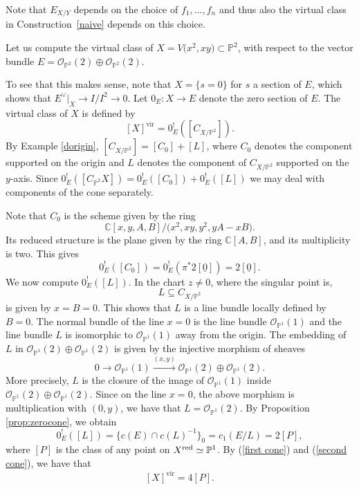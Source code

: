 \documentclass[pdftex]{sigma}
\numberwithin{equation}{section}
\newcommand{\vv}{\mathrm{vir}}
\newcommand{\PP}{\mathbb P}
\begin{document}
Note that $E_{X/Y}$ depends on the choice of $f_1,\ldots, f_n$ and thus also the virtual class in Construction~\ref{naive} depends on this choice.
\begin{Example}\label{doublepoint}
Let us compute the virtual class of $X=V\big(x^2,xy\big)\subset\mathbb{P}^2$, with respect to the vector bundle $E=\mathcal{O}_{\mathbb{P}^2}(2)\oplus \mathcal{O}_{\mathbb{P}^2}(2)$.

To see that this makes sense, note that $X=\{s=0\}$ for $s$ a section of $E$, which shows that $E^\vee\rvert_X\to I/I^2\to 0$. Let $0_E\colon X\to E$ denote the zero section of $E$. The virtual class of $X$ is defined by
\[[X]^{\vv}=0_E^!([C_{X/\mathbb{P}^2}]).
\]
By Example \ref{dorigin}, $[C_{X/\mathbb{P}^2}]=[C_0]+[L]$, where $C_0$ denotes the component supported on the origin and $L$ denotes the component of $C_{X/\mathbb{P}^2}$ supported on the $y$-axis. Since $0_E^!([C_{\mathbb{P}^2} X])=0_E^!([C_0])+0_E^!([L])$ we may deal with components of the cone separately.

Note that $C_0$ is the scheme given by the ring
\[
\mathbb C[x,y,A,B]/ \big(x^2,xy,y^2, yA-xB\big).
\]
Its reduced structure is the plane given by the ring $\mathbb C[A,B]$, and its multiplicity is two. This gives
\begin{equation}\label{first cone}
0_E^!([C_0])=0_E^!(\pi^*2[\underline 0])=2[\underline 0].
\end{equation}
We now compute $0_E^!([L])$. In the chart $z\neq 0$, where the singular point is,
\[L\subseteq C_{X/\mathbb{P}^2} \]
is given by $x=B=0$. This shows that $L$ is a line bundle locally defined by $B=0$. The normal bundle of the line $x=0$ is the line bundle $\mathcal{O}_{\PP^1}(1)$ and the line bundle $L$ is isomorphic to $\mathcal{O}_{\PP^1}(1)$ away from the origin. The embedding of $L$ in $\mathcal{O}_{\PP^1}(2)\oplus \mathcal{O}_{\PP^1}(2)$ is given by the injective morphism of sheaves
\[
0\to \mathcal{O}_{\PP^1}(1)\stackrel{(x,y)}{\longrightarrow} \mathcal{O}_{\PP^1}(2)\oplus \mathcal{O}_{\PP^1}(2).
\]
More precisely, $L$ is the closure of the image of $\mathcal{O}_{\PP^1}(1)$ inside $\mathcal{O}_{\PP^1}(2)\oplus \mathcal{O}_{\PP^1}(2)$.
Since on the line $x=0$, the above morphism is multiplication with $(0, y)$, we have that $L=\mathcal O_{\mathbb{P}^1}(2)$.
By Proposition \ref{prop:zerocone}, we obtain
\begin{equation}\label{second cone}
0_E^!([L])=\big\{c(E)\cap c(L)^{-1}\big\}_{0}=c_1(E/L)=2[P],
\end{equation}
where $[P]$ is the class of any point on $X^{\rm red}\simeq\mathbb{P}^1$. By (\ref{first cone}) and (\ref{second cone}), we have that
\[[X]^{\vv}=4[P].
\]
\end{Example}
\end{document}
